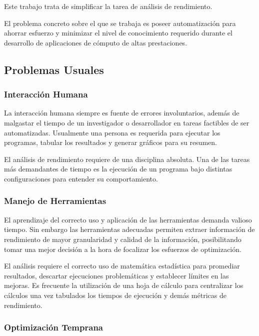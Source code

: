 \documentclass[a4paper]{report}
\begin{document}
Este trabajo trata de simplificar la tarea de análisis de rendimiento. 

\bigskip

El problema concreto sobre el que se trabaja es poseer automatización para ahorrar esfuerzo y minimizar el nivel de conocimiento requerido durante el desarrollo de aplicaciones de cómputo de altas prestaciones.

\subsection{Problemas Usuales}

\subsubsection{Interacción Humana}

La interacción humana siempre es fuente de errores involuntarios, además de malgastar el tiempo de un investigador o desarrollador en tareas factibles de ser automatizadas. Usualmente una persona es requerida para ejecutar los programas, tabular los resultados y generar gráficos para su resumen.

\bigskip

El análisis de rendimiento requiere de una disciplina absoluta. Una de las tareas más demandantes de tiempo es la ejecución de un programa bajo distintas configuraciones para entender su comportamiento.

\subsubsection{Manejo de Herramientas}

El aprendizaje del correcto uso y aplicación de las herramientas demanda valioso tiempo.
Sin embargo las herramientas adecuadas permiten extraer información de rendimiento de mayor granularidad y calidad de la información, posibilitando tomar una mejor decisión a la hora de focalizar los esfuerzos de optimización.

\bigskip

El análisis requiere el correcto uso de matemática estadística para promediar resultados, descartar ejecuciones problemáticas y establecer límites en las mejoras. Es frecuente la utilización de una hoja de cálculo para centralizar los cálculos una vez tabulados los tiempos de ejecución y demás métricas de rendimiento.

\subsubsection{Optimización Temprana}
\end{document}
